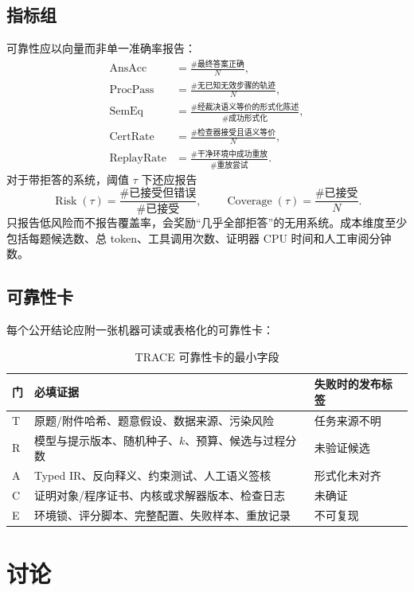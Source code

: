 \documentclass[UTF8,11pt,a4paper,fontset=fandol]{ctexart}
\newcommand{\trace}{\textsf{TRACE}}
\begin{document}
\subsection{指标组}
可靠性应以向量而非单一准确率报告：
\begin{align}
\operatorname{AnsAcc} &= \frac{\#\text{最终答案正确}}{N},\\
\operatorname{ProcPass} &= \frac{\#\text{无已知无效步骤的轨迹}}{N},\\
\operatorname{SemEq} &= \frac{\#\text{经裁决语义等价的形式化陈述}}{\#\text{成功形式化}},\\
\operatorname{CertRate} &= \frac{\#\text{检查器接受且语义等价}}{N},\\
\operatorname{ReplayRate} &= \frac{\#\text{干净环境中成功重放}}{\#\text{重放尝试}}.
\end{align}
对于带拒答的系统，阈值 $\tau$ 下还应报告
\begin{equation}
\operatorname{Risk}(\tau)=\frac{\#\text{已接受但错误}}{\#\text{已接受}},\qquad
\operatorname{Coverage}(\tau)=\frac{\#\text{已接受}}{N}.
\end{equation}
只报告低风险而不报告覆盖率，会奖励“几乎全部拒答”的无用系统。成本维度至少包括每题候选数、总 token、工具调用次数、证明器 CPU 时间和人工审阅分钟数。

\subsection{可靠性卡}
每个公开结论应附一张机器可读或表格化的可靠性卡：
\begin{table}[H]
\centering
\small
\caption{\trace{} 可靠性卡的最小字段}
\begin{tabularx}{\textwidth}{@{}p{2.4cm}X X@{}}
\toprule
门 & 必填证据 & 失败时的发布标签 \\
\midrule
T & 原题/附件哈希、题意假设、数据来源、污染风险 & 任务来源不明 \\
R & 模型与提示版本、随机种子、$k$、预算、候选与过程分数 & 未验证候选 \\
A & Typed IR、反向释义、约束测试、人工语义签核 & 形式化未对齐 \\
C & 证明对象/程序证书、内核或求解器版本、检查日志 & 未确证 \\
E & 环境锁、评分脚本、完整配置、失败样本、重放记录 & 不可复现 \\
\bottomrule
\end{tabularx}
\end{table}

\section{讨论}
\end{document}
